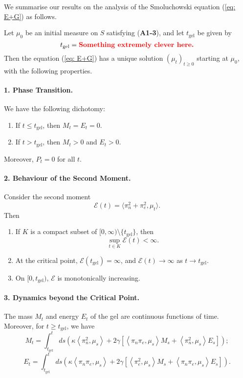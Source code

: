 We summarise our results on the analysis of the Smoluchowski equation (\ref{eq: E+G}) as follows.
\begin{theorem}
Let $\mu_0$ be an initial measure on $S$ satisfying (\textbf{A1-3}), and let $t_\text{gel}$ be given by 
    \begin{equation} \label{eq: def of tgel} t_\text{gel}=\textbf{\textcolor{red}{Something extremely clever here.}}
\end{equation} Then the equation (\ref{eq: E+G}) has a unique solution $(\mu_t)_{t\geq 0}$ starting at $\mu_0$, with the following properties.
\paragraph{1. Phase Transition.} We have the following dichotomy: \begin{enumerate}[label=\roman{*}).]
    \item If $t\leq t_\text{gel}$, then $M_t=E_t=0$.
    \item If $t>t_\text{gel}$, then $M_t>0$ and $E_t>0.$
\end{enumerate}
Moreover, $P_t=0$ for all $t.$
\paragraph{2. Behaviour of the Second Moment.} Consider the second moment \begin{equation} \mathcal{E}(t)=\langle \pi_n^2+ \pi_e^2, \mu_t\rangle. \end{equation} Then \begin{enumerate}[label=\roman{*}).]
    \item If $K$ is a compact subset of $[0, \infty)\setminus\{t_\text{gel}\}$, then \begin{equation}
        \sup_{t\in K}\mathcal{E}(t)<\infty.
    \end{equation}
    \item At the critical point, $\mathcal{E}(t_\text{gel})=\infty$, and $\mathcal{E}(t)\rightarrow \infty$ as $t\rightarrow t_\text{gel}.$ 
    \item On $[0, t_\text{gel})$, $\mathcal{E}$ is monotonically increasing. 
\end{enumerate}
\paragraph{3. Dynamics beyond the Critical Point.} The mass $M_t$ and energy $E_t$ of the gel are continuous functions of time. Moreover, for $t\geq t_\text{gel}$, we have 
\begin{equation}
    M_t=\int_{t_\text{gel}}^t ds
    \left(
      \kappa \left<\pi_n^2,\mu_s\right> +
      2\gamma \left[
        \left<\pi_n \pi_e,\mu_s \right>M_s +
        \left<\pi_n^2,\mu_s \right>E_s \right]
    \right);
\end{equation}
\begin{equation}
    E_t=\int_{t_\text{gel}}^t ds
    \left(
      \kappa \left<\pi_n \pi_e,\mu_s\right> +
      2\gamma \left[
        \left<\pi_e^2,\mu_s \right>M_s +
        \left<\pi_n \pi_e,\mu_s \right>E_s \right]
    \right).
\end{equation}

\end{theorem}
